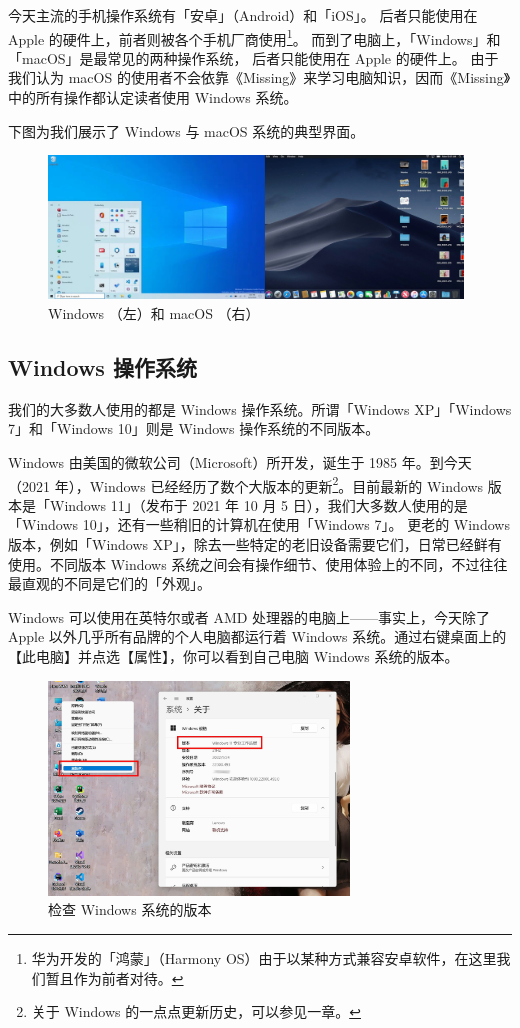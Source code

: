 今天主流的手机操作系统有「安卓」（Android）和「iOS」。
后者只能使用在 Apple 的硬件上，前者则被各个手机厂商使用\footnote{华为开发的「鸿蒙」（Harmony OS）由于以某种方式兼容安卓软件，在这里我们暂且作为前者对待。}。
而到了电脑上，「Windows」和「macOS」是最常见的两种操作系统，
后者只能使用在 Apple 的硬件上。
由于我们认为 macOS 的使用者不会依靠《Missing》来学习电脑知识，因而《Missing》中的所有操作都认定读者使用 Windows 系统。

下图为我们展示了 Windows 与 macOS 系统的典型界面。

\begin{figure}[htb!]
  \centering
  \includegraphics[width=11cm]{assets/Windows_and_macOS.jpg}
  \caption{Windows （左）和 macOS （右）}
  \label{win-and-mac}
\end{figure}

\subsection{Windows 操作系统}

我们的大多数人使用的都是 Windows 操作系统。所谓「Windows XP」「Windows 7」和「Windows 10」则是 Windows 操作系统的不同版本。

Windows 由美国的微软公司（Microsoft）所开发，诞生于 1985 年。到今天（2021 年），Windows 已经经历了数个大版本的更新\footnote{关于 Windows 的一点点更新历史，可以参见一章。}。目前最新的 Windows 版本是「Windows 11」（发布于 2021 年 10 月 5 日），我们大多数人使用的是「Windows 10」，还有一些稍旧的计算机在使用「Windows 7」。
更老的 Windows 版本，例如「Windows XP」，除去一些特定的老旧设备需要它们，日常已经鲜有使用。不同版本 Windows 系统之间会有操作细节、使用体验上的不同，不过往往最直观的不同是它们的「外观」。

Windows 可以使用在英特尔或者 AMD 处理器的电脑上——事实上，今天除了 Apple 以外几乎所有品牌的个人电脑都运行着 Windows 系统。通过右键桌面上的【此电脑】并点选【属性】，你可以看到自己电脑 Windows 系统的版本。

\begin{figure}[H]
  \centering
  \includegraphics[width=8cm]{assets/Check_Windows_version.jpg}
  \caption{检查 Windows 系统的版本}
  \label{check-windows-version}
\end{figure}


